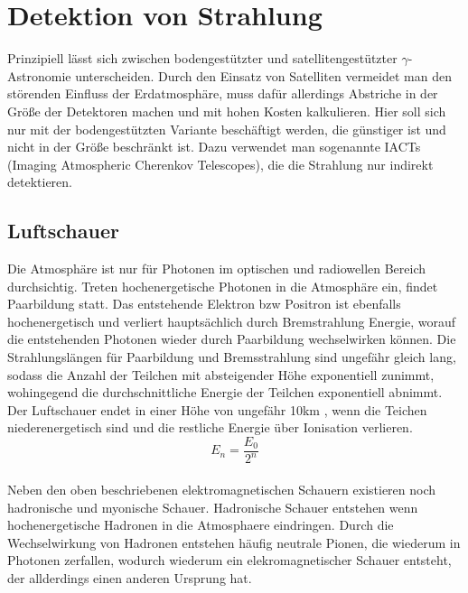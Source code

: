\section{Detektion von Strahlung}
Prinzipiell lässt sich zwischen bodengestützter und satellitengestützter $\gamma$-Astronomie unterscheiden. Durch den Einsatz von Satelliten vermeidet man den störenden Einfluss der Erdatmosphäre, muss dafür allerdings Abstriche in der Größe der Detektoren machen und mit hohen Kosten kalkulieren. Hier soll sich nur mit der bodengestützten Variante beschäftigt werden, die günstiger ist und nicht in der Größe beschränkt ist. Dazu verwendet man sogenannte IACTs (Imaging Atmospheric Cherenkov Telescopes), die die Strahlung nur indirekt detektieren.

\subsection{Luftschauer}
Die Atmosphäre ist nur für Photonen im optischen und radiowellen Bereich durchsichtig. Treten hochenergetische Photonen in die Atmosphäre ein, findet Paarbildung statt. Das entstehende Elektron bzw Positron ist ebenfalls hochenergetisch und verliert hauptsächlich durch Bremstrahlung Energie, worauf die entstehenden Photonen wieder durch Paarbildung wechselwirken können. Die Strahlungslängen für Paarbildung und Bremsstrahlung sind ungefähr gleich lang, sodass die Anzahl der Teilchen mit absteigender Höhe exponentiell zunimmt, wohingegend die durchschnittliche Energie der Teilchen exponentiell abnimmt. Der Luftschauer endet in einer Höhe von ungefähr 10km 
\cite{iwas}, wenn die Teichen niederenergetisch sind und die restliche Energie über Ionisation verlieren.
\begin{equation}
E_n=\frac{E_0}{2^n}
\end{equation}\\
Neben den oben beschriebenen elektromagnetischen Schauern existieren noch hadronische und myonische Schauer. Hadronische Schauer entstehen wenn hochenergetische Hadronen in die Atmosphaere eindringen. Durch die Wechselwirkung von Hadronen entstehen häufig neutrale Pionen, die wiederum in Photonen zerfallen, wodurch wiederum ein elekromagnetischer Schauer entsteht, der allderdings einen anderen Ursprung hat. %

